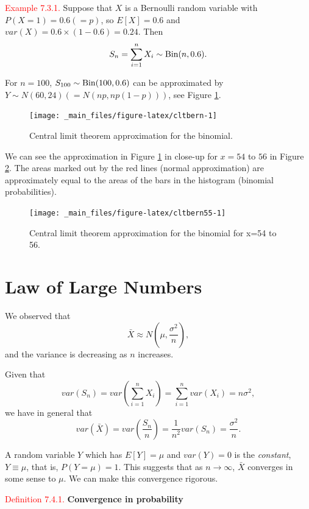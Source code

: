 \documentclass[
]{book}
\begin{document}
\leavevmode{}%
\textcolor{red}{Example 7.3.1.}
Suppose that \(X\) is a Bernoulli random variable with \(P(X=1)=0.6 (=p)\), so \(E[X]=0.6\) and \(var(X) =0.6 \times (1-0.6) =0.24\). Then \[S_n = \sum_{i=1}^n X_i \sim {\rm Bin} (n, 0.6). \]

For \(n=100\), \(S_{100} \sim {\rm Bin} (100, 0.6)\) can be approximated by \(Y\sim N(60,24) (=N(np,np(1-p)))\), see Figure \ref{fig:cltbern}.

\begin{figure}
\texttt{[image: \_main\_files/figure-latex/cltbern-1]} \caption{Central limit theorem approximation for the binomial.}\label{fig:cltbern}
\end{figure}

We can see the approximation in Figure \ref{fig:cltbern} in close-up for \(x=54\) to \(56\) in Figure \ref{fig:cltbern55}. The areas marked out by the red lines (normal approximation) are approximately equal to the areas of the bars in the histogram (binomial probabilities).

\begin{figure}
\texttt{[image: \_main\_files/figure-latex/cltbern55-1]} \caption{Central limit theorem approximation for the binomial for x=54 to 56.}\label{fig:cltbern55}
\end{figure}

\hypertarget{Sec_CLT:LLN}{%
\section{Law of Large Numbers}\label{Sec_CLT:LLN}}

We observed that
\[ \bar{X} \approx N\left(\mu, \frac{\sigma^2}{n} \right), \]
and the variance is decreasing as \(n\) increases.

Given that \[var (S_n) = var \left(\sum_{i=1}^n X_i \right) = \sum_{i=1}^n var \left( X_i \right) = n \sigma^2,\] we have in general that \[var (\bar{X}) = var \left(\frac{S_n}{n} \right) = \frac{1}{n^2} var (S_n) = \frac{\sigma^2}{n}.\]

A random variable \(Y\) which has \(E[Y]=\mu\) and \(var(Y)=0\) is the \emph{constant}, \(Y \equiv \mu\), that is, \(P(Y=\mu) =1\). This suggests that as \(n \to \infty\), \(\bar{X}\) converges in some sense to \(\mu\). We can make this convergence rigorous.

\leavevmode{}%
\textcolor{red}{Definition 7.4.1.}
{\textbf{Convergence in probability}}
\end{document}
